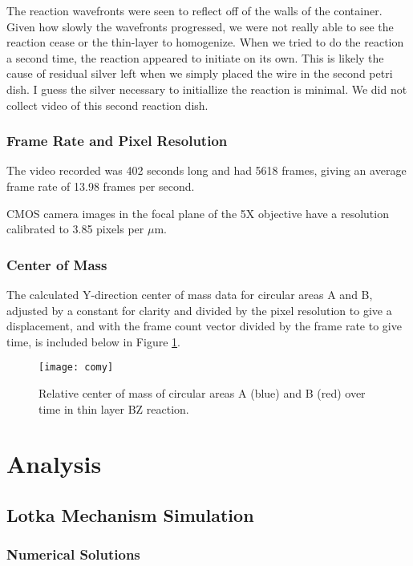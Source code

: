\documentclass{article}
\begin{document}
The reaction wavefronts were seen to reflect off of the walls of the container. Given how 
slowly the wavefronts progressed, we were not really able to see the reaction cease or the
thin-layer to homogenize. When we tried to do the reaction a second time, the reaction 
appeared to initiate on its own. This is likely the cause of residual silver left when we simply 
placed the wire in the second petri dish. I guess the silver necessary to initiallize the reaction
is minimal. We did not collect video of this second reaction dish.

\subsubsection{Frame Rate and Pixel Resolution}

The video recorded was 402 seconds long and had 5618 frames, giving an average frame rate 
of 13.98 frames per second.

CMOS camera images in the focal plane of the 5X objective have a resolution calibrated to
3.85 pixels per $\mu$m.

\subsubsection{Center of Mass}

The calculated Y-direction center of mass data for circular areas A and B, adjusted by a 
constant for clarity and divided by the pixel resolution to give a displacement, and with the 
frame count vector divided by the frame rate to give time, is included below in
Figure \ref{com}.

\begin{figure}[H]
\texttt{[image: comy]}
\centering
\caption{Relative center of mass of circular areas A (blue) and B (red) over time in thin layer
BZ reaction.}
\label{com}
\end{figure}

\section{Analysis}

\subsection{Lotka Mechanism Simulation}

\subsubsection{Numerical Solutions}
\end{document}
